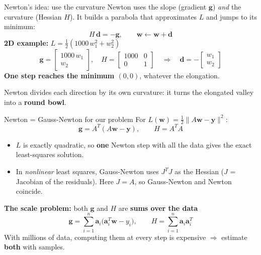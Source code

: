 \documentclass[10pt,aspectratio=169]{beamer}
\newcommand{\hl}[1]{\textcolor{accent}{\textbf{#1}}}
\begin{document}
\begin{frame}{Newton's idea: use the curvature}
  Newton uses the slope (gradient $\bm{g}$) \emph{and} the curvature
  (Hessian $H$). It builds a parabola that approximates $L$ and jumps to its
  minimum:
  \[
    H\,\bm{d} = -\bm{g}, \qquad \bm{w} \leftarrow \bm{w} + \bm{d}
  \]
  \textbf{2D example:} $L = \frac12(1000\,w_1^2 + w_2^2)$
  \[
    \bm{g} = \begin{bmatrix} 1000\,w_1 \\ w_2 \end{bmatrix}, \quad
    H = \begin{bmatrix} 1000 & 0 \\ 0 & 1 \end{bmatrix}
    \quad\Rightarrow\quad
    \bm{d} = -\begin{bmatrix} w_1 \\ w_2 \end{bmatrix}
  \]
  \hl{One step reaches the minimum $(0,0)$}, whatever the elongation.
  \vspace{0.5em}

  Newton divides each direction by its own curvature: it turns the
  elongated valley into a \hl{round bowl}.
\end{frame}

\begin{frame}{Newton = Gauss-Newton for our problem}
  For $L(\bm{w}) = \frac12\lVert A\bm{w} - \bm{y}\rVert^2$:
  \[
    \bm{g} = A^T(A\bm{w} - \bm{y}), \qquad H = A^TA
  \]
  \begin{itemize}
    \item $L$ is exactly quadratic, so \hl{one} Newton step with all the data
          gives the exact least-squares solution.
    \item In \emph{nonlinear} least squares, Gauss-Newton uses $J^TJ$ as the
          Hessian ($J$ = Jacobian of the residuals). Here $J = A$, so
          Gauss-Newton and Newton coincide.
  \end{itemize}
  \vspace{0.5em}
  \textbf{The scale problem:} both $\bm{g}$ and $H$ are \hl{sums over the
  data}
  \[
    \bm{g} = \sum_{i=1}^{n} \bm{a}_i\big(\bm{a}_i^T\bm{w} - y_i\big), \qquad
    H = \sum_{i=1}^{n} \bm{a}_i\bm{a}_i^T
  \]
  With millions of data, computing them at every step is expensive
  \;$\Rightarrow$\; estimate \hl{both} with samples.
\end{frame}
\end{document}

